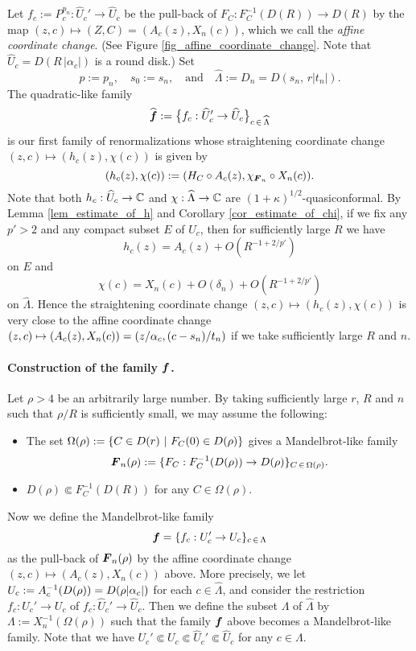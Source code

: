 Let $f_c:=P_c^{p_n}:\widehat{U}_c' \to \widehat{U}_c$
be the pull-back of $F_C:F_C^{-1}(D(R)) \to D(R)$
by the map $(z,c) \mapsto (Z,C)=(A_c(z),X_n(c))$,
which we call the {\it affine coordinate change}.
(See Figure \ref{fig_affine_coordinate_change}.
Note that $\widehat{U}_c=D(R \, |\alpha_c|)$ is a round disk.)
Set 
$$
p:=p_n,\quad s_0:=s_n,\quad \text{and} \quad 
\widehat{\Lambda}:=D_n=D(s_n,\, r |t_n| ).
$$
The quadratic-like family
$$
\widehat{{\boldsymbol{f}}}:=
\big\{f_c:\widehat{U}_c'\to \widehat{U}_c \big\}
_{c \,\in \,\widehat{\Lambda}}
$$
is our first family of renormalizations
whose straightening coordinate change $(z,c) \mapsto (h_c(z),\chi(c))$
is given by
$$
(h_c(z),\chi(c)):= (H_C \circ A_c(z), \chi_{{\boldsymbol{F}}_n} \circ X_n(c)).
$$
Note that both $h_c:\widehat{U}_c \to \mathbb C$ 
and $\chi:\widehat{\Lambda} \to \mathbb C$
are $(1+\kappa)^{1/2}$-quasiconformal.
By Lemma \ref{lem_estimate_of_h} and Corollary \ref{cor_estimate_of_chi},
if we fix any $p'>2$
and any compact subset $E$ of $U_c$,
then for sufficiently large $R$ we have 
$$
h_c(z) =A_c(z) +O(R^{-1+2/p'})
$$
on $E$ 
and 
$$
\chi(c)= X_n(c)+ O(\delta_n)+O(R^{-1+2/p'})
$$
on $\widehat{\Lambda}$. 
Hence the straightening coordinate change 
$(z,c) \mapsto (h_c(z),\chi(c))$
is very close to the affine coordinate change 
$(z,c) \mapsto (A_c(z),X_n(c))=(z/\alpha_c,(c-s_n)/t_n)$
if we take sufficiently large $R$ and $n$.


\paragraph{\bf Construction of the family ${\boldsymbol{f}}$.}
Let $\rho>4$ be an arbitrarily large number.
By taking sufficiently large $r$, $R$ and $n$
such that $\rho/R$ is sufficiently small,
we may assume the following:
\begin{itemize}
\item
The set $\Omega(\rho):={\left\{ C \in D(r)\ | \  F_C(0) \in D(\rho) \right\}}$
gives a Mandelbrot-like family
$$
\boldsymbol{F}_n(\rho):=\{F_C:F_C^{-1}(D(\rho)) \to D(\rho)\}_{C \,\in \,\Omega(\rho)}.
$$
\item 
$D(\rho) \Subset F_C^{-1}(D(R))$ for any $C \in \Omega(\rho)$.
\end{itemize}
Now we define the Mandelbrot-like family
$$
\boldsymbol{f}=\{f_c:U_c' \to U_c\}_{c \,\in \,\Lambda}
$$ 
as the pull-back of $\boldsymbol{F}_n(\rho)$ by the affine coordinate change 
$(z,c) \mapsto (A_c(z),X_n(c))$ above.
More precisely,
we let 
$U_c:=A_c^{-1}(D(\rho))=D(\rho|\alpha_c|)$
for each $c \in \widehat{\Lambda}$,
and consider the restriction $f_c:U_c' \to U_c$ of
$f_c:\widehat{U}_c' \to \widehat{U}_c$.
Then we define the subset $\Lambda$ of $\widehat{\Lambda}$ by 
$\Lambda:=X_n^{-1}(\Omega(\rho))$ such that the family $\boldsymbol{f}$ above
becomes a Mandelbrot-like family.
Note that we have 
$U_c' \Subset U_c \Subset \widehat{U}_c' \Subset \widehat{U}_c$
for any $c \in \Lambda$.

